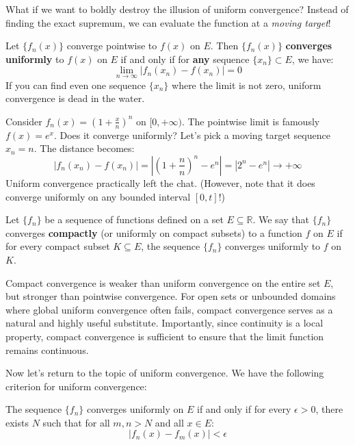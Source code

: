What if we want to boldly destroy the illusion of uniform convergence? Instead of finding the exact supremum, we can evaluate the function at a \textit{moving target}!

\begin{theorem}
Let $\{f_n(x)\}$ converge pointwise to $f(x)$ on $E$. Then $\{f_n(x)\}$ \textbf{converges uniformly} to $f(x)$ on $E$ if and only if for \textbf{any} sequence $\{x_n\} \subset E$, we have:
\[ \lim_{n \to \infty} \left| f_n(x_n) - f(x_n) \right| = 0 \]
If you can find even one sequence $\{x_n\}$ where the limit is not zero, uniform convergence is dead in the water.
\end{theorem}

\begin{example}
Consider $f_n(x) = \left(1+\frac{x}{n}\right)^n$ on $[0,+\infty)$. The pointwise limit is famously $f(x) = e^x$. 
Does it converge uniformly? Let's pick a moving target sequence $x_n = n$. The distance becomes:
\[ |f_n(x_n) - f(x_n)| = \left| \left(1+\frac{n}{n}\right)^n - e^n \right| = |2^n - e^n| \to +\infty \]
Uniform convergence practically left the chat. (However, note that it does converge uniformly on any bounded interval $[0, t]$!)
\end{example}

\begin{definition}
    Let $\{f_n\}$ be a sequence of functions defined on a set $E \subseteq \mathbb{R}$. We say that $\{f_n\}$ converges \textbf{compactly} (or uniformly on compact subsets) to a function $f$ on $E$ if for every compact subset $K \subseteq E$, the sequence $\{f_n\}$ converges uniformly to $f$ on $K$.
\end{definition}

Compact convergence is weaker than uniform convergence on the entire set $E$, but stronger than pointwise convergence. For open sets or unbounded domains where global uniform convergence often fails, compact convergence serves as a natural and highly useful substitute. Importantly, since continuity is a local property, compact convergence is sufficient to ensure that the limit function remains continuous.

Now let's return to the topic of uniform convergence. We have the following criterion for uniform convergence:

\begin{theorem}
The sequence $\{f_n\}$ converges uniformly on $E$ if and only if for every $\epsilon > 0$, there exists $N$ such that for all $m, n > N$ and all $x \in E$:
\[ |f_n(x) - f_m(x)| < \epsilon \]
\end{theorem}

